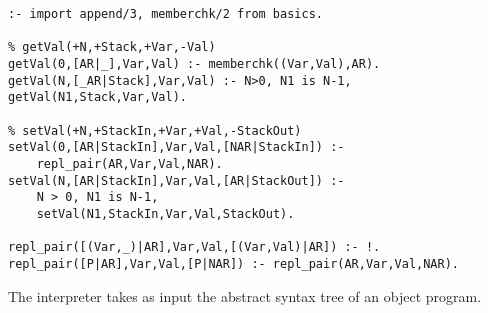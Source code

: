\begin{verbatim}
:- import append/3, memberchk/2 from basics.

% getVal(+N,+Stack,+Var,-Val)
getVal(0,[AR|_],Var,Val) :- memberchk((Var,Val),AR).
getVal(N,[_AR|Stack],Var,Val) :- N>0, N1 is N-1, getVal(N1,Stack,Var,Val).

% setVal(+N,+StackIn,+Var,+Val,-StackOut)
setVal(0,[AR|StackIn],Var,Val,[NAR|StackIn]) :-
	repl_pair(AR,Var,Val,NAR).
setVal(N,[AR|StackIn],Var,Val,[AR|StackOut]) :-
	N > 0, N1 is N-1,
	setVal(N1,StackIn,Var,Val,StackOut).

repl_pair([(Var,_)|AR],Var,Val,[(Var,Val)|AR]) :- !.
repl_pair([P|AR],Var,Val,[P|NAR]) :- repl_pair(AR,Var,Val,NAR).
\end{verbatim}

The interpreter takes as input the abstract syntax tree of an object
program.


